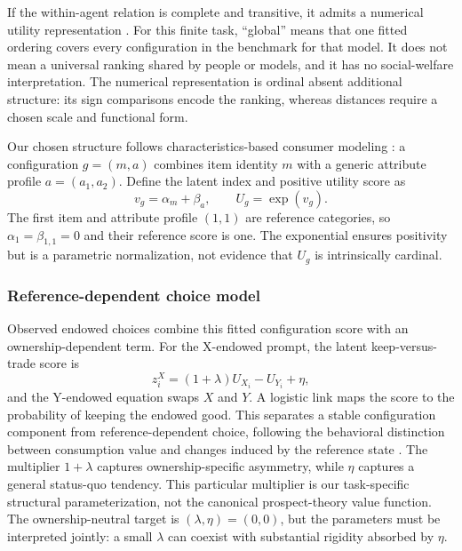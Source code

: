 \documentclass[11pt,letterpaper]{article}
\begin{document}
If the within-agent relation is complete and transitive, it admits a numerical
utility representation \citep{debreu1954representation}. For this finite task,
``global'' means that one fitted ordering covers every configuration in the
benchmark for that model. It does not mean a universal ranking shared by
people or models, and it has no social-welfare interpretation. The numerical
representation is ordinal absent additional structure: its sign comparisons
encode the ranking, whereas distances require a chosen scale and functional
form.

Our chosen structure follows characteristics-based consumer modeling
\citep{lancaster1966new}: a configuration $g=(m,a)$ combines item identity $m$
with a generic attribute profile $a=(a_1,a_2)$. Define the latent index and
positive utility score as
\begin{equation}
v_g=\alpha_m+\beta_a,
\qquad
U_g=\exp(v_g).
\label{eq:configuration-utility}
\end{equation}
The first item and attribute profile $(1,1)$ are reference categories, so
$\alpha_1=\beta_{1,1}=0$ and their reference score is one. The exponential
ensures positivity but is a parametric normalization, not evidence that
$U_g$ is intrinsically cardinal.

\subsubsection{Reference-dependent choice model}

Observed endowed choices combine this fitted configuration score with an
ownership-dependent term. For the X-endowed prompt, the latent keep-versus-
trade score is
\begin{equation}
z_i^X=(1+\lambda)U_{X_i}-U_{Y_i}+\eta,
\label{eq:structural}
\end{equation}
and the Y-endowed equation swaps $X$ and $Y$. A logistic link maps the score to
the probability of keeping the endowed good. This separates a stable
configuration component from reference-dependent choice, following the
behavioral distinction between consumption value and changes induced by the
reference state \citep{tversky1991loss}. The multiplier $1+\lambda$ captures
ownership-specific asymmetry, while $\eta$ captures a general status-quo
tendency. This particular multiplier is our task-specific structural
parameterization, not the canonical prospect-theory value function. The
ownership-neutral target is $(\lambda,\eta)=(0,0)$, but the parameters must be
interpreted jointly: a small $\lambda$ can coexist with substantial rigidity
absorbed by $\eta$.
\end{document}
